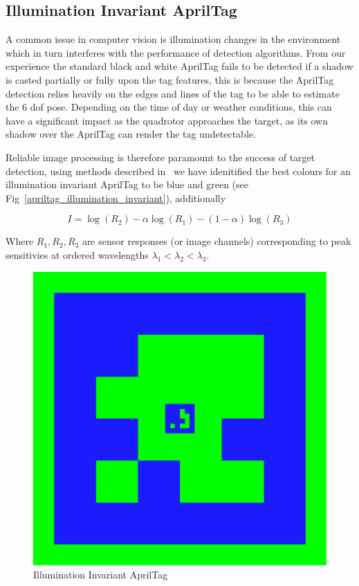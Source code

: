 \documentclass[letterpaper, 10 pt, conference]{ieeeconf}
\begin{document}
\subsection{Illumination Invariant AprilTag}
A common issue in computer vision is illumination changes in the
environment which in turn interferes with the performance of detection
algorithms. From our experience the standard black and white AprilTag
fails to be detected if a shadow is casted partially or fully upon the tag
features, this is because the AprilTag detection relies heavily on the
edges and lines of the tag to be able to estimate the 6 dof pose.
Depending on the time of day or weather conditions, this can have
a significant impact as the quadrotor approaches the target, as its own
shadow over the AprilTag can render the tag undetectable.

Reliable image processing is therefore paramount to the success of target
detection, using methods described in~\cite{Maddern14} we have idenitified
the best colours for an illumination invariant AprilTag to be blue and
green (see Fig~\ref{apriltag_illumination_invariant}), additionally

\begin{equation}
  I = \log(R_{2}) - \alpha \log(R_{1}) - (1 - \alpha) \log(R_{3})
\end{equation}

Where $R_{1}, R_{2}, R_{3}$ are sensor responses (or image channels)
corresponding to peak sensitivies at ordered wavelengths $\lambda_{1}
< \lambda_{2} < \lambda_{3}$.


\begin{figure}
\label{fig:apriltag_illumination_invariant}
  \includegraphics[width=\linewidth]{images/apriltag_illumination_invariant}
  \caption{Illumination Invariant AprilTag}
\end{figure}
\end{document}
